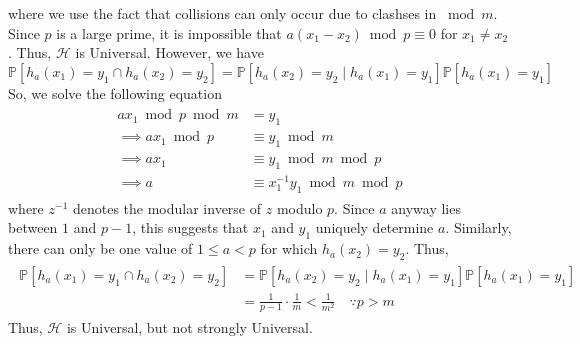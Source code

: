 \documentclass[9pt]{article}
\newcommand{\Probability}[1]{\mathbb{P}\left[ #1 \right]}
\begin{document}
where we use the fact that collisions can only occur due to clashses in $\bmod m$. Since $p$
is a large prime, it is impossible that $a(x_{1} - x_{2}) \bmod p \equiv 0$ for $x_{1} \neq x_{2}$.
Thus, $\mathcal{H}$ is Universal. However, we have
\begin{equation}
    \Probability{h_{a}(x_{1}) = y_{1} \cap h_{a}(x_{2}) = y_{2}}
    = \Probability{h_{a}(x_{2}) = y_{2} \mid h_{a}(x_{1}) = y_{1}} \Probability{h_{a}(x_{1}) = y_{1}}
\end{equation}
So, we solve the following equation
\begin{align}
    \begin{split}
        ax_{1} \bmod p \bmod m &= y_{1} \\
        \implies ax_{1} \bmod p &\equiv y_{1} \bmod m \\
        \implies ax_{1} &\equiv y_{1} \bmod m \bmod p \\
        \implies a &\equiv x_{1}^{-1} y_{1} \bmod m \bmod p
    \end{split}
\end{align}
where $z^{-1}$ denotes the modular inverse of $z$ modulo $p$. Since $a$ anyway lies between $1$ and $p-1$,
this suggests that $x_{1}$ and $y_{1}$ uniquely determine $a$. Similarly, there can only be one value of
$1 \leq a < p$ for which $h_{a}(x_{2}) = y_{2}$. Thus,
\begin{align}
    \begin{split}
        \Probability{h_{a}(x_{1}) = y_{1} \cap h_{a}(x_{2}) = y_{2}}
        &= \Probability{h_{a}(x_{2}) = y_{2} \mid h_{a}(x_{1}) = y_{1}} \Probability{h_{a}(x_{1}) = y_{1}} \\
        &= \frac{1}{p-1} \cdot \frac{1}{m} < \frac{1}{m^{2}}
        \quad \because p > m
    \end{split}
\end{align}
Thus, $\mathcal{H}$ is Universal, but not strongly Universal.
\end{document}
